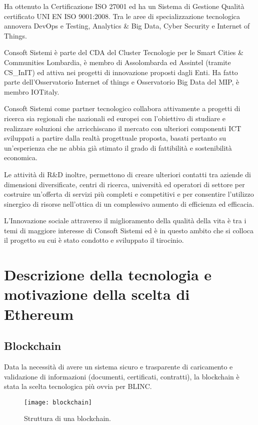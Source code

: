 Ha ottenuto la Certificazione ISO 27001 ed ha un Sistema di Gestione Qualità certificato UNI EN ISO 9001:2008.
Tra le aree di specializzazione tecnologica
annovera DevOps e Testing, Analytics \& Big Data, Cyber Security e Internet of Things.

Consoft Sistemi è parte del CDA del Cluster Tecnologie
per le Smart Cities \& Communities Lombardia, è membro di Assolombarda ed Assintel
(tramite CS\_InIT) ed attiva nei progetti di innovazione proposti dagli Enti.
Ha fatto parte dell’Osservatorio Internet of things e Osservatorio Big Data del MIP, è membro IOTitaly.

Consoft Sistemi come partner tecnologico collabora attivamente a progetti di ricerca sia regionali che nazionali
ed europei con l’obiettivo di studiare e realizzare soluzioni che arricchiscano il mercato con ulteriori
componenti ICT sviluppati a partire dalla realtà progettuale proposta,
basati pertanto su un'esperienza che ne abbia già stimato il grado di fattibilità e sostenibilità economica.

Le attività di R\&D inoltre, permettono di creare ulteriori contatti tra aziende di dimensioni diversificate, centri di ricerca,
università ed operatori di settore per costruire un’offerta di servizi più completi e competitivi e per consentire l’utilizzo sinergico di risorse
nell'ottica di un complessivo aumento di efficienza ed efficacia.

L’Innovazione sociale attraverso il miglioramento della qualità della vita è tra i temi di maggiore interesse di Consoft
Sistemi ed è in questo ambito
che si colloca il progetto su cui è stato condotto e sviluppato il tirocinio.

\section{Descrizione della tecnologia e motivazione della scelta di Ethereum}

\subsection{Blockchain}

Data la necessità di avere un sistema sicuro e trasparente di caricamento e validazione di informazioni
(documenti, certificati, contratti),
la blockchain è stata la scelta tecnologica più ovvia per BLINC.

\begin{figure}[h!]
    \texttt{[image: blockchain]}
    \caption{Struttura di una blockchain.}
    \label{fig:blockchain}
\end{figure}

